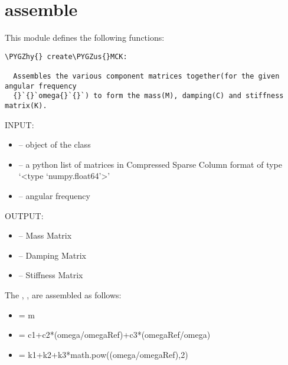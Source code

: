 \documentclass[letterpaper,10pt,english]{sphinxmanual}
\def\PYGZus{\char`\_}
\def\PYGZhy{\char`\-}
\begin{document}
\section{assemble}
\label{index:assemble}\label{index:module-assemble}
This module defines the following functions:

\begin{Verbatim}[commandchars=\\\{\}]
\PYGZhy{} create\PYGZus{}MCK:

  Assembles the various component matrices together(for the given angular frequency
  {}`{}`omega{}`{}`) to form the mass(M), damping(C) and stiffness matrix(K).
\end{Verbatim}

\begin{fulllineitems}
\label{index:assemble.create_MCK}
INPUT:
\begin{itemize}
\item {} 
 -- object of the class 

\item {} 
 -- a python list of matrices in Compressed Sparse Column format 
of type `\textless{}type `numpy.float64'\textgreater{}'

\item {} 
 -- angular frequency

\end{itemize}

OUTPUT:
\begin{itemize}
\item {} 
 -- Mass Matrix

\item {} 
 -- Damping Matrix

\item {} 
 -- Stiffness Matrix

\end{itemize}

The  ,  ,  are assembled as follows:
\begin{itemize}
\item {} 
 = m

\item {} 
 = c1+c2*(omega/omegaRef)+c3*(omegaRef/omega)

\item {} 
 = k1+k2+k3*math.pow((omega/omegaRef),2)

\end{itemize}

\end{fulllineitems}
\end{document}
